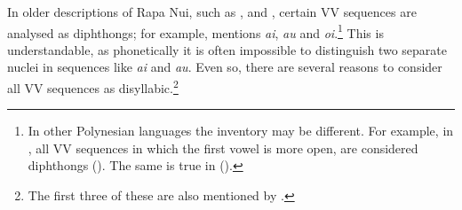 In older descriptions of Rapa Nui, such as \citet{Englert1978}, \citet{Fuentes1960} and \citet{Salas1973}, certain VV sequences are analysed as diphthongs; for example, \citet[16]{Englert1978} mentions \textit{ai}, \textit{au} and \textit{oi}.\footnote{\label{fn:38}In other Polynesian languages the  inventory may be different. For example, in , all VV sequences in which the first vowel is more open, are considered diphthongs (\citealt[5]{AcadémieTahitienne1986}). The same is true in  (\citealt[69]{Harlow2007Maori}).} This is understandable, as phonetically it is often impossible to distinguish two separate  nuclei in sequences like \textit{ai} and \textit{au}. Even so, there are several reasons to consider all VV sequences as disyllabic.\footnote{\label{fn:39}The first three of these are also mentioned by \citet{WeberWeber1982}.} 

